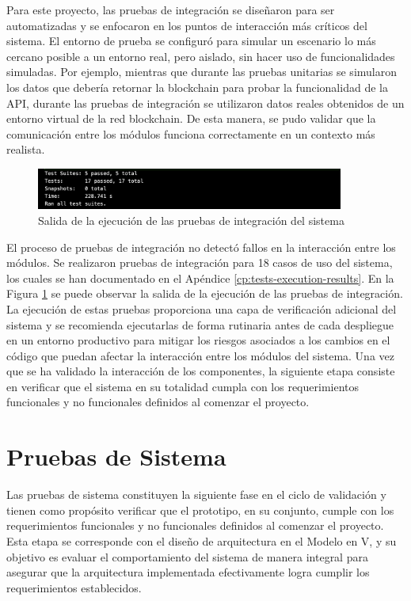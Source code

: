 Para este proyecto, las pruebas de integración se diseñaron para ser automatizadas y se enfocaron en los puntos de interacción más críticos del sistema. El entorno de prueba se configuró para simular un escenario lo más cercano posible a un entorno real, pero aislado, sin hacer uso de funcionalidades simuladas. Por ejemplo, mientras que durante las pruebas unitarias se simularon los datos que debería retornar la blockchain para probar la funcionalidad de la API, durante las pruebas de integración se utilizaron datos reales obtenidos de un entorno virtual de la red blockchain. De esta manera, se pudo validar que la comunicación entre los módulos funciona correctamente en un contexto más realista.

\begin{figure}[!htb]
	\centering
	\includegraphics[width=0.9\textwidth]{Figures/integration-test-results.png}
	\caption{Salida de la ejecución de las pruebas de integración del sistema}
	\label{fig:integration-test-results}
\end{figure}

El proceso de pruebas de integración no detectó fallos en la interacción entre los módulos. Se realizaron pruebas de integración para 18 casos de uso del sistema, los cuales se han documentado en el Apéndice \ref{cp:tests-execution-results}. En la Figura \ref{fig:integration-test-results} se puede observar la salida de la ejecución de las pruebas de integración. La ejecución de estas pruebas proporciona una capa de verificación adicional del sistema y se recomienda ejecutarlas de forma rutinaria antes de cada despliegue en un entorno productivo para mitigar los riesgos asociados a los cambios en el código que puedan afectar la interacción entre los módulos del sistema. Una vez que se ha validado la interacción de los componentes, la siguiente etapa consiste en verificar que el sistema en su totalidad cumpla con los requerimientos funcionales y no funcionales definidos al comenzar el proyecto.

\section{Pruebas de Sistema}
\label{sec:system-testing}

Las pruebas de sistema constituyen la siguiente fase en el ciclo de validación y tienen como propósito verificar que el prototipo, en su conjunto, cumple con los requerimientos funcionales y no funcionales definidos al comenzar el proyecto. Esta etapa se corresponde con el diseño de arquitectura en el Modelo en V, y su objetivo es evaluar el comportamiento del sistema de manera integral para asegurar que la arquitectura implementada efectivamente logra cumplir los requerimientos establecidos.

